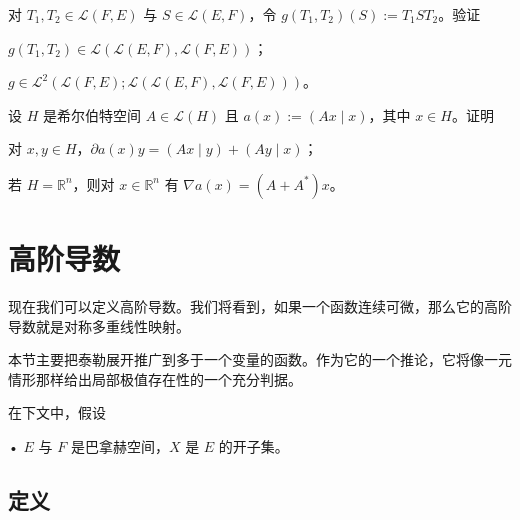 \begin{exercises}
\item

对 $ T_{1}, T_{2} \in \mathcal{L}(F,E) $ 与 $ S \in \mathcal{L}(E,F) $，令 $ g(T_{1},T_{2})(S) := T_{1}ST_{2} $。验证

\begin{items}
\item

$ g(T_{1},T_{2}) \in \mathcal{L}(\mathcal{L}(E,F),\mathcal{L}(F,E)) $；

\item

$ g \in \mathcal{L}^{2}(\mathcal{L}(F,E);\mathcal{L}(\mathcal{L}(E,F),\mathcal{L}(F,E))) $。

\end{items}

\item

设 $ H $ 是希尔伯特空间 $ A \in \mathcal{L}(H) $ 且 $ a(x) := (Ax \mid x) $，其中 $ x \in H $。证明

\begin{items}
\item

对 $ x, y \in H $，$ \partial a(x)y = (Ax \mid y) + (Ay \mid x) $；

\item

若 $ H = \mathbb{R}^{n} $，则对 $ x \in \mathbb{R}^{n} $ 有 $ \nabla a(x) = (A + A^{*})x $。

\end{items}

\end{exercises}

\section{高阶导数}

现在我们可以定义高阶导数。我们将看到，如果一个函数连续可微，那么它的高阶导数就是对称多重线性映射。

本节主要把泰勒展开推广到多于一个变量的函数。作为它的一个推论，它将像一元情形那样给出局部极值存在性的一个充分判据。

在下文中，假设

• $ E $ 与 $ F $ 是巴拿赫空间，$ X $ 是 $ E $ 的开子集。

\subsection*{定义}

